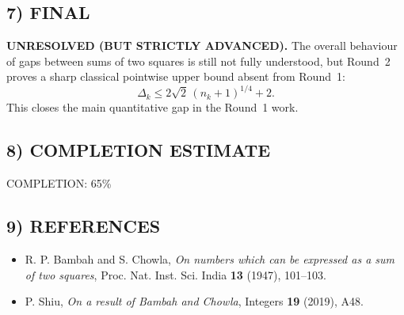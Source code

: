 \subsection*{7) FINAL}
\textbf{UNRESOLVED (BUT STRICTLY ADVANCED).}  The overall behaviour of gaps between sums of two squares is still not fully understood, but Round~2 proves a sharp classical pointwise upper bound absent from Round~1:
\[
\Delta_k \le 2\sqrt{2}\,(n_k+1)^{1/4}+2.
\]
This closes the main quantitative gap in the Round~1 work.

\subsection*{8) COMPLETION ESTIMATE}
COMPLETION: 65\%

\subsection*{9) REFERENCES}
\begin{itemize}
\item R. P. Bambah and S. Chowla, \emph{On numbers which can be expressed as a sum of two squares}, Proc. Nat. Inst. Sci. India \textbf{13} (1947), 101--103.
\item P. Shiu, \emph{On a result of Bambah and Chowla}, Integers \textbf{19} (2019), A48.
\end{itemize}


